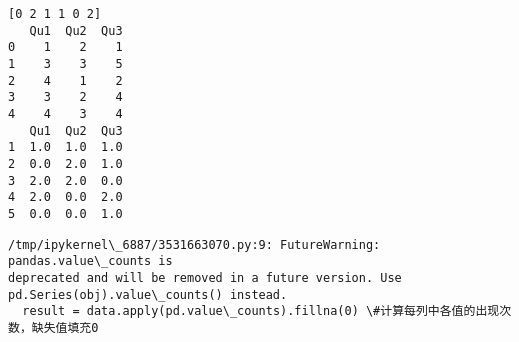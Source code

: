 \documentclass[11pt]{article}
\begin{document}
    \begin{Verbatim}[commandchars=\\\{\}]
[0 2 1 1 0 2]
   Qu1  Qu2  Qu3
0    1    2    1
1    3    3    5
2    4    1    2
3    3    2    4
4    4    3    4
   Qu1  Qu2  Qu3
1  1.0  1.0  1.0
2  0.0  2.0  1.0
3  2.0  2.0  0.0
4  2.0  0.0  2.0
5  0.0  0.0  1.0
    \end{Verbatim}

    \begin{Verbatim}[commandchars=\\\{\}]
/tmp/ipykernel\_6887/3531663070.py:9: FutureWarning: pandas.value\_counts is
deprecated and will be removed in a future version. Use
pd.Series(obj).value\_counts() instead.
  result = data.apply(pd.value\_counts).fillna(0) \#计算每列中各值的出现次数，缺失值填充0
    \end{Verbatim}


    
    
    
\end{document}
